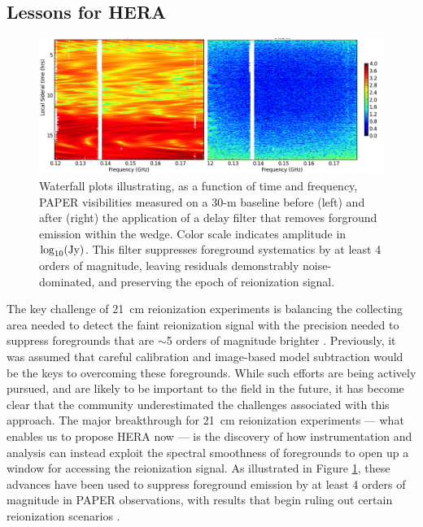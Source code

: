 \documentclass[preprint]{aastex}
\newcommand{\compress}{\vspace{-0.3in}}
\begin{document}
\compress
\subsection{Lessons for HERA}


\begin{figure}[t]\centering
\includegraphics[width=6in]{plots/waterfall_filtered.png}
\caption{\small 
Waterfall plots illustrating, as a function of time and frequency, PAPER visibilities
measured on a 30-m baseline before (left) and after (right) the application of a 
delay filter that removes forground emission within the wedge.  Color scale indicates amplitude in $\log_{10}({\rm Jy})$.
This filter suppresses
foreground systematics by at least 4 orders of magnitude, leaving residuals demonstrably noise-dominated, and preserving the epoch of reionization signal.
}\label{fig:waterfall} \end{figure}


The key challenge of 21~cm reionization experiments is 
balancing the collecting area needed to detect the faint reionization signal
with the precision needed to suppress
foregrounds that are $\sim$5 orders of magnitude brighter \citep{deolivieracosta_et_al2008}.
Previously, it was assumed that careful calibration and image-based model subtraction would be the keys to overcoming these foregrounds.
While such efforts are being actively pursued, and are likely to be important to the field in the future,
it has become clear that the community underestimated the challenges associated with this approach.
The major breakthrough for 21~cm reionization experiments --- what enables us to propose HERA now --- is 
the discovery of how 
instrumentation and analysis can instead exploit the 
spectral smoothness of foregrounds 
to open up a window for accessing the reionization signal. 
As illustrated in Figure \ref{fig:waterfall}, these advances have been used to suppress foreground emission by at least 4
orders of magnitude in PAPER observations,
with results that begin ruling out certain reionization scenarios
\citep{parsons_et_al2013}.
\end{document}
